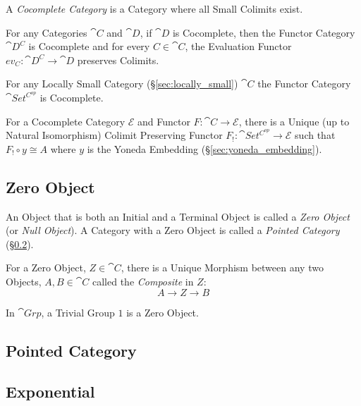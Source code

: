 A \emph{Cocomplete Category} is a Category where all Small Colimits
exist.

For any Categories $\cat{C}$ and $\cat{D}$, if $\cat{D}$ is
Cocomplete, then the Functor Category $\cat{D^C}$ is Cocomplete and
for every $C \in \cat{C}$, the Evaluation Functor $ev_C :
\cat{D^C} \rightarrow \cat{D}$ preserves Colimits.

For any Locally Small Category (\S\ref{sec:locally_small})
$\cat{C}$ the Functor Category $\cat{Set^{C^{op}}}$ is
Cocomplete.

For a Cocomplete Category $\mathcal{E}$ and Functor $F : \cat{C}
\rightarrow \mathcal{E}$, there is a Unique (up to Natural
Isomorphism) Colimit Preserving Functor $F_! : \cat{Set^{C^{op}}}
\rightarrow \mathcal{E}$ such that $F_! \circ y \cong A$ where $y$ is
the Yoneda Embedding (\S\ref{sec:yoneda_embedding}).\cite{awodey06}



\subsection{Zero Object}\label{sec:zero_object}

An Object that is both an Initial and a Terminal Object is called a
\emph{Zero Object} (or \emph{Null Object}). A Category with a Zero
Object is called a \emph{Pointed Category}
(\S\ref{sec:pointed_category}).

For a Zero Object, $Z \in \cat{C}$, there is a Unique Morphism
between any two Objects, $A, B \in \cat{C}$ called the
\emph{Composite} in $Z$:
\[
  A \rightarrow Z \rightarrow B
\]

In $\cat{Grp}$, a Trivial Group ${1}$ is a Zero Object.



\subsection{Pointed Category}\label{sec:pointed_category}



\subsection{Exponential}\label{sec:category_exponential}


